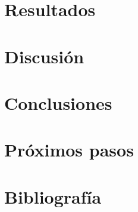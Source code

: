  

\section{Resultados} 
\section{Discusión}
\section{Conclusiones}
\section{Próximos pasos}

\section{Bibliografía}
\printbibliography[heading=subbibliography]
